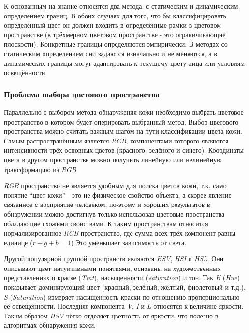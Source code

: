 \documentclass[12pt]{report}
\begin{document}
К основанным на знание относятся два метода: с статическим и динамическим определением границ. В обоих случаях для 
того, что бы классифицировать определённый цвет он должен входить в определённые рамки в цветовом пространстве (в 
трёхмерном цветовом пространстве - это ограничивающие плоскости). Конкретные границы определяются эмпирически. В 
методах со статическим определением они задаются изначально и не меняются, а в динамических границы могут 
адаптировать к текущему цвету лица или условиям освещённости. 

\subsubsection{Проблема выбора цветового пространства}
Параллельно с выбором метода обнаружения кожи необходимо выбрать цветовое пространство в котором будет оперировать 
выбранный метод. Выбор цветового пространства можно считать важным шагом на пути классификации цвета кожи. Самым 
распространённым является \textit{RGB}, компонентами которого являются интенсивности трёх основных цветов 
(красного, 
зелёного и синего). Координаты цвета в другом пространстве можно получить линейную или нелинейную трансформацию из 
\textit{RGB}. \cite{kakumanu2007survey} 

\textit{RGB} пространство не является удобным для поиска цветов кожи, т.к. само понятие ``цвет кожи'' - это не 
физическое свойство объекта, а скорее явление связанное с восприятие человеком, по-этому и хороших результатов в 
обнаружении можно достигнув только использовав цветовые пространства обладающие схожими свойствами. К таким 
пространствам относится нормализированное \textit{RGB} пространство, где сумма всех трёх компонент равны единице 
($r
+g+b=1$) Это уменьшает зависимость от света. \citep{vezhnevets2003survey}

Другой популярной группой пространств являются \textit{HSV}, \textit{HSI} и \textit{HSL}. Они описывают цвет 
интуитивными понятиями, основаны на художественных представлениях о краске (\textit{Tint}), насыщенности (\textit
{saturation}) и тон. Так \textit{H} (\textit{Hue}) показывает доминирующий цвет (красный, зелёный, жёлтый, 
фиолетовый 
и т.д.), \textit{S} (\textit{Saturation}) измеряет насыщенность краски по отношению пропорционально её 
освещённости. 
Последняя компонента \textit{V}, \textit{I} и \textit{L} относятся к величине яркости. Таким образом \textit{HSV} 
чётко отделяет цветность от яркости, что полезно в алгоритмах обнаружения кожи. \citep{vezhnevets2003survey}
\end{document}
